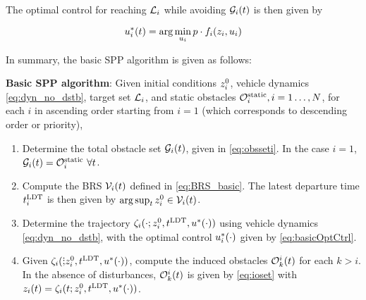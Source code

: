 The optimal control for reaching $\mathcal{L}_i$ while avoiding $\mathcal{G}_i(t)$ is then given by

\begin{equation}
\label{eq:basicOptCtrl}
\ctrl_i^*(t) = \arg \min_{\ctrl_i} p \cdot \fdyn_i(\state_i, \ctrl_i)
\end{equation}

In summary, the basic SPP algorithm is given as follows:

\begin{alg}
\label{alg:basic}
\textbf{Basic SPP algorithm}: Given initial conditions $z_i^0$, vehicle dynamics \eqref{eq:dyn_no_dstb}, target set $\mathcal{L}_i$, and static obstacles $\mathcal{O}^\text{static}_i, i = 1\ldots, N$, for each $i$ in ascending order starting from $i=1$ (which corresponds to descending order or priority),
\begin{enumerate}
\item Determine the total obstacle set $\mathcal{G}_i(t)$, given in \eqref{eq:obsseti}. In the case $i=1$, $\mathcal{G}_i(t) = \mathcal{O}^\text{static}_i ~ \forall t$.
\item Compute the BRS $\mathcal{V}_i(t)$ defined in \eqref{eq:BRS_basic}. The latest departure time $t^\text{LDT}_i$ is then given by $\arg \sup_t z^0_i \in \mathcal{V}_i(t)$.
\item Determine the trajectory $\zeta_i(\cdot; z_i^0, t^\text{LDT}, u^*(\cdot))$ using vehicle dynamics \eqref{eq:dyn_no_dstb}, with the optimal control  $u_i^*(\cdot)$ given by \eqref{eq:basicOptCtrl}.
\item Given $\zeta_i(\dot; z_i^0, t^\text{LDT}, u^*(\cdot))$, compute the induced obstacles $\mathcal{O}_k^i(t)$ for each $k>i$. In the absence of disturbances, $\mathcal{O}_k^i(t)$ is given by \eqref{eq:ioset} with $z_i(t) = \zeta_i(t; z_i^0, t^\text{LDT}, u^*(\cdot))$.
\end{enumerate}
\end{alg}